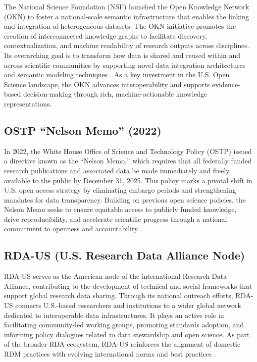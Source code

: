 The National Science Foundation (NSF) launched the Open Knowledge Network (OKN) to foster a national-scale semantic infrastructure that enables the linking and integration of heterogeneous datasets. The OKN initiative promotes the creation of interconnected knowledge graphs to facilitate discovery, contextualization, and machine readability of research outputs across disciplines. Its overarching goal is to transform how data is shared and reused within and across scientific communities by supporting novel data integration architectures and semantic modeling techniques \cite{nsf_okn}. As a key investment in the U.S. Open Science landscape, the OKN advances interoperability and supports evidence-based decision-making through rich, machine-actionable knowledge representations.

\subsection{OSTP “Nelson Memo” (2022)}

In 2022, the White House Office of Science and Technology Policy (OSTP) issued a directive known as the “Nelson Memo,” which requires that all federally funded research publications and associated data be made immediately and freely available to the public by December 31, 2025. This policy marks a pivotal shift in U.S. open access strategy by eliminating embargo periods and strengthening mandates for data transparency. Building on previous open science policies, the Nelson Memo seeks to ensure equitable access to publicly funded knowledge, drive reproducibility, and accelerate scientific progress through a national commitment to openness and accountability \cite{ostp_nelson}.

\subsection{RDA-US (U.S. Research Data Alliance Node)}

RDA-US serves as the American node of the international Research Data Alliance, contributing to the development of technical and social frameworks that support global research data sharing. Through its national outreach efforts, RDA-US connects U.S.-based researchers and institutions to a wider global network dedicated to interoperable data infrastructures. It plays an active role in facilitating community-led working groups, promoting standards adoption, and informing policy dialogues related to data stewardship and open science. As part of the broader RDA ecosystem, RDA-US reinforces the alignment of domestic RDM practices with evolving international norms and best practices \cite{rda_us}.


